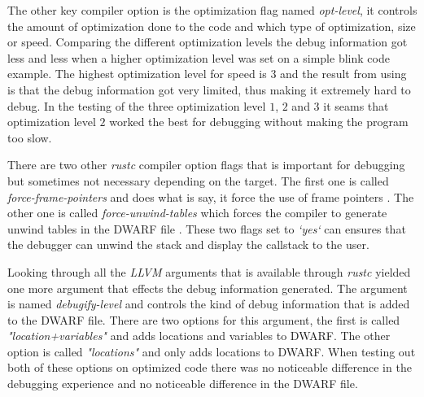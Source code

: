 The other key compiler option is the optimization flag named \emph{opt-level}, it controls the amount of optimization done to the code and which type of optimization, size or speed.
Comparing the different optimization levels the debug information got less and less when a higher optimization level was set on a simple blink code example.
The highest optimization level for speed is $3$ and the result from using is that the debug information got very limited, thus making it extremely hard to debug.
In the testing of the three optimization level $1$, $2$ and $3$ it seams that optimization level $2$ worked the best for debugging without making the program too slow.


There are two other \emph{rustc} compiler option flags that is important for debugging but sometimes not necessary depending on the target.
The first one is called \emph{force-frame-pointers} and does what is say, it force the use of frame pointers \cite{rustc-book-codegen}.
The other one is called \emph{force-unwind-tables} which forces the compiler to generate unwind tables in the \gls{DWARF} file \cite{rustc-book-codegen}.
These two flags set to \emph{`yes`} can ensures that the debugger can unwind the stack and display the callstack to the user.


Looking through all the \emph{LLVM} arguments that is available through \emph{rustc} yielded one more argument that effects the debug information generated.
The argument is named \emph{debugify-level} and controls the kind of debug information that is added to the \gls{DWARF} file.
There are two options for this argument, the first is called \emph{"location+variables"} and adds locations and variables to \gls{DWARF}.
The other option is called \emph{"locations"} and only adds locations to \gls{DWARF}.
When testing out both of these options on optimized code there was no noticeable difference in the debugging experience and no noticeable difference in the  \gls{DWARF} file.




%
%

